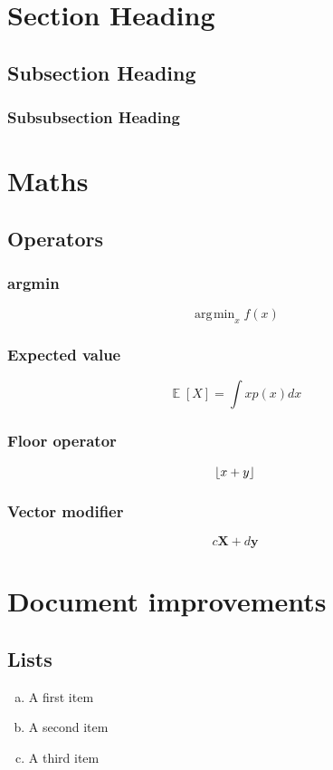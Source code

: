 \documentclass{article}
\DeclareMathOperator*{\argmin}{\arg\!\min}
\DeclareMathOperator{\E}{\mathbb{E}}
\DeclarePairedDelimiter\floor{\lfloor}{\rfloor}
\renewcommand{\vec}[1]{\mathbf{#1}} %
\begin{document}
\section{Section Heading}
\subsection{Subsection Heading}
\subsubsection{Subsubsection Heading}

\section{Maths}
\subsection{Operators}
\subsubsection{argmin}
$$\argmin_{x}{f(x)}$$

\subsubsection{Expected value}
$$\E[X] = \int{xp(x)dx}$$

\subsubsection{Floor operator}
$$\floor{x+y}$$

\subsubsection{Vector modifier}
$$c\vec{X} + d\vec{y}$$

\section{Document improvements}
\subsection{Lists}
\begin{enumerate}[(a)]
  \item A first item
  \item A second item
  \item A third item
\end{enumerate}
\end{document}
